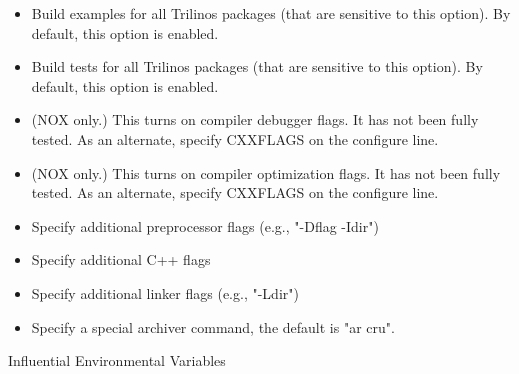 \begin{itemize}
\item {}

Build examples for all Trilinos packages (that are sensitive to 
this option).  By default, this option is enabled.

\item {} 

Build tests for all Trilinos packages (that are sensitive to this option).  
By default, this option is enabled.

\item {} 

(NOX only.)  This turns on compiler debugger flags. It has 
not been fully tested. As an alternate, specify CXXFLAGS on the 
                 configure line.

\item {}

(NOX only.)  This turns on compiler optimization flags. It 
has not been fully tested. As an alternate, specify CXXFLAGS on the 
                 configure line. 

\item {}

Specify additional preprocessor flags (e.g., "-Dflag -Idir") 

\item {}

Specify additional C++ flags 

\item {}

Specify additional linker flags (e.g., "-Ldir") 

\item {}

Specify a special archiver command, the default is "ar cru". 
\end{itemize}

 Influential Environmental Variables

